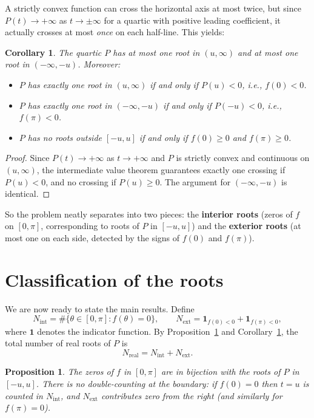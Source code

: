 \documentclass[12pt]{article}
\newtheorem{proposition}[theorem]{Proposition}
\newtheorem{corollary}[theorem]{Corollary}
\theoremstyle{definition}
\theoremstyle{remark}
\begin{document}
A strictly convex function can cross the horizontal axis at most twice, but since $P(t) \to +\infty$ as $t \to \pm\infty$ for a quartic with positive leading coefficient, it actually crosses at most \emph{once} on each half-line. This yields:

\begin{corollary}\label{cor:ext}
The quartic $P$ has at most one root in $(u, \infty)$ and at most one root in $(-\infty, -u)$. Moreover:
\begin{itemize}
\item $P$ has exactly one root in $(u, \infty)$ if and only if $P(u) < 0$, i.e., $f(0) < 0$.
\item $P$ has exactly one root in $(-\infty, -u)$ if and only if $P(-u) < 0$, i.e., $f(\pi) < 0$.
\item $P$ has no roots outside $[-u,u]$ if and only if $f(0) \geq 0$ and $f(\pi) \geq 0$.
\end{itemize}
\end{corollary}

\begin{proof}
Since $P(t) \to +\infty$ as $t \to +\infty$ and $P$ is strictly convex and continuous on $(u, \infty)$, the intermediate value theorem guarantees exactly one crossing if $P(u) < 0$, and no crossing if $P(u) \geq 0$. The argument for $(-\infty, -u)$ is identical.
\end{proof}

So the problem neatly separates into two pieces: the \textbf{interior roots} (zeros of $f$ on $[0,\pi]$, corresponding to roots of $P$ in $[-u,u]$) and the \textbf{exterior roots} (at most one on each side, detected by the signs of $f(0)$ and $f(\pi)$).

\section{Classification of the roots}

We are now ready to state the main results. Define
\[
N_{\mathrm{int}} = \#\{\theta \in [0,\pi] : f(\theta) = 0\}, \qquad N_{\mathrm{ext}} = \mathbf{1}_{f(0)<0} + \mathbf{1}_{f(\pi)<0},
\]
where $\mathbf{1}$ denotes the indicator function. By Proposition~\ref{prop:bijection_formal} and Corollary~\ref{cor:ext}, the total number of real roots of $P$ is
\begin{equation}\label{eq:Nreal}
N_{\mathrm{real}} = N_{\mathrm{int}} + N_{\mathrm{ext}}.
\end{equation}

\begin{proposition}\label{prop:bijection_formal}
The zeros of $f$ in $[0,\pi]$ are in bijection with the roots of $P$ in $[-u,u]$. There is no double-counting at the boundary: if $f(0) = 0$ then $t = u$ is counted in $N_{\mathrm{int}}$, and $N_{\mathrm{ext}}$ contributes zero from the right (and similarly for $f(\pi) = 0$).
\end{proposition}
\end{document}
